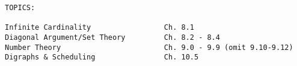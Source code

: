 \documentclass[quiz]{mcs}
\begin{document}


\begin{staffnotes}
\begin{verbatim}
TOPICS:

Infinite Cardinality                 Ch. 8.1
Diagonal Argument/Set Theory         Ch. 8.2 - 8.4
Number Theory                        Ch. 9.0 - 9.9 (omit 9.10-9.12)
Digraphs & Scheduling                Ch. 10.5       

\end{verbatim}
\end{staffnotes}





\examspace













\end{document}

